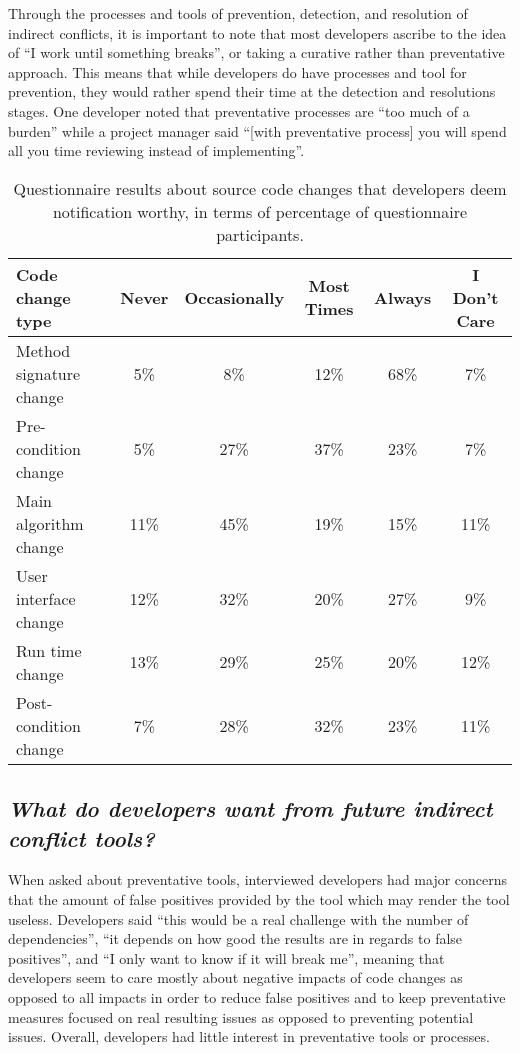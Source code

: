 \documentclass[conference]{IEEEtran}
\begin{document}
Through the processes and tools of prevention, detection, and resolution of indirect conflicts, it is important to note that
most developers ascribe to the idea of ``I work until something breaks'', or taking a curative rather than preventative
approach. This means that while developers do have processes and tool for prevention, they would rather spend their time
at the detection and resolutions stages. One developer noted that preventative processes are ``too much of a burden''
while a project manager said ``[with preventative process] you will spend all you time reviewing instead of implementing''.

\begin{table*}[tb!]
\begin{center}
\begin{tabular}{| p{7cm} | c | c | c | c | c |}
\hline
Code change type &Never  & Occasionally & Most Times & Always & I Don't Care \\
\hline
\hline
Method signature change & 5\% & 8\% & 12\% & 68\% & 7\% \\ \hline
Pre-condition change & 5\% & 27\% & 37\% & 23\% & 7\% \\ \hline
Main algorithm change & 11\% & 45\% & 19\% & 15\% & 11\% \\ \hline
User interface change & 12\% & 32\% & 20\% & 27\% & 9\% \\ \hline
Run time change & 13\% & 29\% & 25\% & 20\% & 12\% \\ \hline
Post-condition change & 7\% & 28\% & 32\% & 23\% & 11\% \\ \hline
\end{tabular}
\end{center}
\caption{Questionnaire results about source code changes that developers deem notification worthy, in terms of percentage
of questionnaire participants.\label{tab:pre}}
\end{table*}

{}
\subsection*{ \it{What do developers want from future indirect conflict tools?}}

When asked about preventative tools, interviewed developers had major concerns that the amount of false positives
provided by the tool which may render the tool useless. Developers said ``this would
be a real challenge with the number of dependencies'', ``it depends on how
good the results are in regards to false positives'', and ``I only want to know if it will break me'', meaning that
developers seem to care mostly about negative impacts of code changes as opposed to all impacts in order to reduce
false positives and to keep preventative measures focused on real resulting issues as opposed to preventing potential
issues. Overall, developers had little interest in preventative tools or processes.
\end{document}
